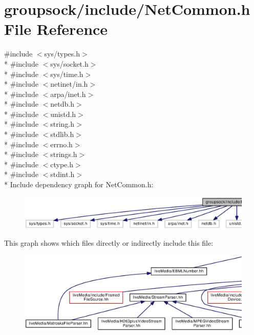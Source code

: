 \section{groupsock/include/\+Net\+Common.h File Reference}
\label{NetCommon_8h}
{\ttfamily \#include $<$sys/types.\+h$>$}\\*
{\ttfamily \#include $<$sys/socket.\+h$>$}\\*
{\ttfamily \#include $<$sys/time.\+h$>$}\\*
{\ttfamily \#include $<$netinet/in.\+h$>$}\\*
{\ttfamily \#include $<$arpa/inet.\+h$>$}\\*
{\ttfamily \#include $<$netdb.\+h$>$}\\*
{\ttfamily \#include $<$unistd.\+h$>$}\\*
{\ttfamily \#include $<$string.\+h$>$}\\*
{\ttfamily \#include $<$stdlib.\+h$>$}\\*
{\ttfamily \#include $<$errno.\+h$>$}\\*
{\ttfamily \#include $<$strings.\+h$>$}\\*
{\ttfamily \#include $<$ctype.\+h$>$}\\*
{\ttfamily \#include $<$stdint.\+h$>$}\\*
Include dependency graph for Net\+Common.\+h\+:
\nopagebreak
\begin{figure}[H]
\begin{center}
\leavevmode
\includegraphics[width=350pt]{NetCommon_8h__incl}
\end{center}
\end{figure}
This graph shows which files directly or indirectly include this file\+:
\nopagebreak
\begin{figure}[H]
\begin{center}
\leavevmode
\includegraphics[width=350pt]{NetCommon_8h__dep__incl}
\end{center}
\end{figure}
